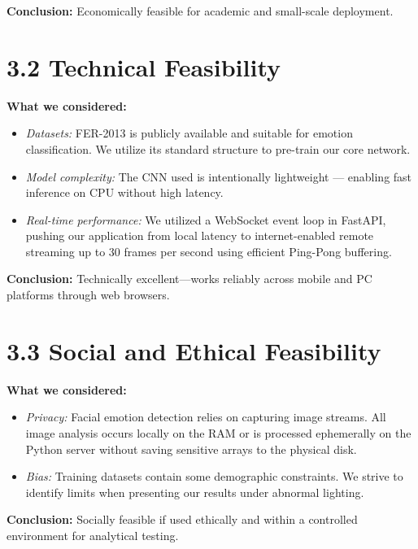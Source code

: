 \documentclass[12pt,a4paper]{report}
\begin{document}
\textbf{Conclusion:}  
Economically feasible for academic and small-scale deployment.

\section*{3.2 Technical Feasibility}

\textbf{What we considered:}
\begin{itemize}
    \item \textit{Datasets:} FER-2013 is publicly available and suitable for emotion classification. We utilize its standard structure to pre-train our core network.
    \item \textit{Model complexity:} The CNN used is intentionally lightweight — enabling fast inference on CPU without high latency.
    \item \textit{Real-time performance:} We utilized a WebSocket event loop in FastAPI, pushing our application from local latency to internet-enabled remote streaming up to 30 frames per second using efficient Ping-Pong buffering.
\end{itemize}

\textbf{Conclusion:}  
Technically excellent—works reliably across mobile and PC platforms through web browsers.

\section*{3.3 Social and Ethical Feasibility}

\textbf{What we considered:}
\begin{itemize}
    \item \textit{Privacy:} Facial emotion detection relies on capturing image streams. All image analysis occurs locally on the RAM or is processed ephemerally on the Python server without saving sensitive arrays to the physical disk.
    \item \textit{Bias:} Training datasets contain some demographic constraints. We strive to identify limits when presenting our results under abnormal lighting.
\end{itemize}

\textbf{Conclusion:}  
Socially feasible if used ethically and within a controlled environment for analytical testing.

\clearpage

\end{document}
